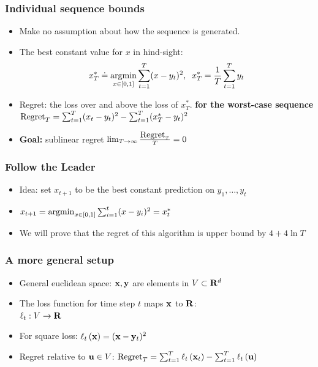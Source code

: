 \documentclass{beamer}
\begin{document}
\begin{frame}
\frametitle{Individual sequence bounds}
\begin{itemize}
\item Make no assumption about how the sequence is generated.
\item The best constant value for $x$ in hind-sight:\\
  $$x^*_T \doteq \operatorname*{argmin}_{x \in [0,1]} \sum_{t=1}^T (x-y_t)^2,\;\; x^*_T=\frac{1}{T}
  \sum_{t=1}^T y_t$$ 
\item Regret: the loss over and above the loss of $x^*_T$. {\bf for the
    worst-case sequence}
  $ \mbox{Regret}_T = \sum_{t=1}^T (x_t-y_t)^2 - \sum_{t=1}^T (x^*_T-y_t)^2
  $
\item {\bf Goal:} sublinear regret $\lim_{T \to \infty} \frac{\mbox{Regret}_T}{T} = 0$
\end{itemize}
\end{frame}

\begin{frame}
\frametitle{Follow the Leader}
\begin{itemize}
\item Idea: set $x_{t+1}$ to be the best constant prediction on $y_1,\ldots,y_t$
\item 
  $x_{t+1} = \operatorname*{argmin}_{x \in [0,1]} \sum_{i=1}^t (x-y_i)^2 = x^*_t$ 
\item We will prove that the regret of this algorithm is upper bound
  by $4+4 \ln T$
\end{itemize}
\end{frame}
\iffalse
\begin{frame}
\frametitle{A more general setup}
\begin{itemize}
\item General euclidean space: ${\mathbf x},{\mathbf y}$ are elements in $V \subset {\mathbf R}^d$
\item The loss function for time step $t$ maps ${\mathbf x}$ to ${\mathbf R}$:\\
  $\ell_t: V \to {\mathbf R}$
\item For square loss: $\ell_{t}\left( {\mathbf x} \right) = ({\mathbf x} -{\mathbf y}_t)^2$
\item Regret relative to ${\mathbf u} \in V$:
$\mbox{Regret}_T = \sum_{t=1}^T \ell_{t}\left( {\mathbf x}_t \right) - \sum_{t=1}^T
  \ell_{t}\left( {\mathbf u} \right) $
\end{itemize}
\end{frame}
\end{document}
